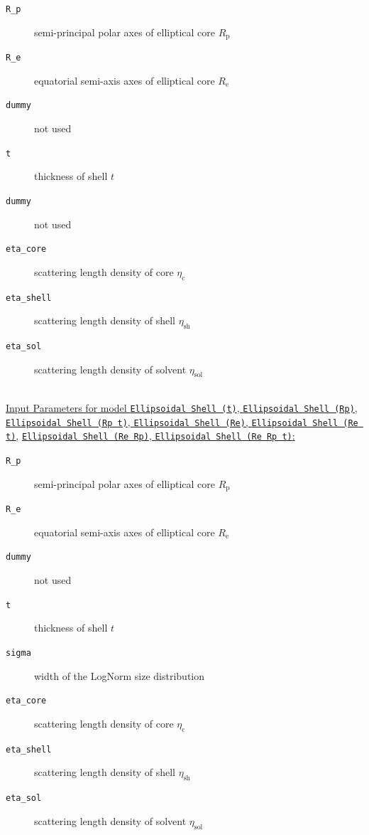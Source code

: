 \begin{description}
\item[\texttt{R\_p}] semi-principal polar axes of elliptical core $R_\mathrm{p}$
\item[\texttt{R\_e}] equatorial semi-axis axes of elliptical core $R_\mathrm{e}$
\item[\texttt{dummy}] not used
\item[\texttt{t}] thickness of shell $t$
\item[\texttt{dummy}] not used
\item[\texttt{eta\_core}] scattering length density of core $\eta_\text{c}$
\item[\texttt{eta\_shell}] scattering length density of shell $\eta_\text{sh}$
\item[\texttt{eta\_sol}] scattering length density of solvent $\eta_\text{sol}$
\end{description}
~\\
\uline{Input Parameters for model \texttt{Ellipsoidal Shell (t)}, \texttt{Ellipsoidal Shell (Rp)},}
\uline{\texttt{Ellipsoidal Shell (Rp t)}, \texttt{Ellipsoidal Shell (Re)}, \texttt{Ellipsoidal Shell (Re t)},}
\uline{\texttt{Ellipsoidal Shell (Re Rp)}, \texttt{Ellipsoidal Shell (Re Rp t)}:}
\begin{description}
\item[\texttt{R\_p}] semi-principal polar axes of elliptical core $R_\mathrm{p}$
\item[\texttt{R\_e}] equatorial semi-axis axes of elliptical core $R_\mathrm{e}$
\item[\texttt{dummy}] not used
\item[\texttt{t}] thickness of shell $t$
\item[\texttt{sigma}] width of the LogNorm size distribution
\item[\texttt{eta\_core}] scattering length density of core $\eta_\text{c}$
\item[\texttt{eta\_shell}] scattering length density of shell $\eta_\text{sh}$
\item[\texttt{eta\_sol}] scattering length density of solvent $\eta_\text{sol}$
\end{description}

